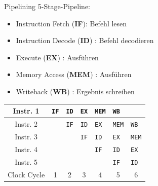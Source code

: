 \begin{example}{Pipelining}
    5-Stage-Pipeline:
    \begin{itemize}
        \item Instruction Fetch (\textbf{IF}): Befehl lesen
        \item Instruction Decode (\textbf{ID}) : Befehl decodieren
        \item Execute (\textbf{EX}) : Ausführen
        \item Memory Access (\textbf{MEM}) : Ausführen
        \item Writeback (\textbf{WB}) : Ergebnis schreiben
    \end{itemize}

    \begin{center}
        \begin{tabular}{| c || m{} | m{} | m{} | m{} | m{} | m{} |}
            \hline
            Instr. 1    & \texttt{IF}            & \texttt{ID}            & \texttt{EX}            & \texttt{MEM}           & \texttt{WB}            &                        \\
            \hline
            Instr. 2    &                        & \texttt{IF}            & \texttt{ID}            & \texttt{EX}            & \texttt{MEM}           & \texttt{WB}            \\
            \hline
            Instr. 3    &                        &                        & \texttt{IF}            & \texttt{ID}            & \texttt{EX}            & \texttt{MEM}           \\
            \hline
            Instr. 4    &                        &                        &                        & \texttt{IF}            & \texttt{ID}            & \texttt{EX}            \\
            \hline
            Instr. 5    &                        &                        &                        &                        & \texttt{IF}            & \texttt{ID}            \\
            \hline
            \hline
            Clock Cycle & \multicolumn{1}{c|}{1} & \multicolumn{1}{c|}{2} & \multicolumn{1}{c|}{3} & \multicolumn{1}{c|}{4} & \multicolumn{1}{c|}{5} & \multicolumn{1}{c|}{6} \\
            \hline
        \end{tabular}
    \end{center}
\end{example}

